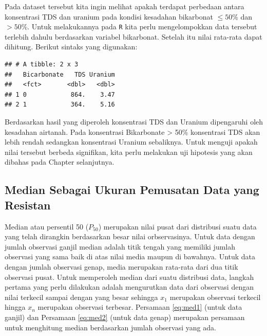\documentclass[]{book}
\newenvironment{Shaded}{\begin{snugshade}}{\end{snugshade}}
\newcommand{\KeywordTok}[1]{\textcolor[rgb]{0.13,0.29,0.53}{\textbf{#1}}}
\newcommand{\DataTypeTok}[1]{\textcolor[rgb]{0.13,0.29,0.53}{#1}}
\newcommand{\StringTok}[1]{\textcolor[rgb]{0.31,0.60,0.02}{#1}}
\newcommand{\OperatorTok}[1]{\textcolor[rgb]{0.81,0.36,0.00}{\textbf{#1}}}
\newcommand{\NormalTok}[1]{#1}
\begin{document}
Pada dataset tersebut kita ingin melihat apakah terdapat perbedaan
antara konsentrasi TDS dan uranium pada kondisi kesadahan bikarbonat
\(\leq 50\)\% dan \(> 50\)\%. Untuk melakukannya pada \texttt{R} kita
perlu mengelompokkan data tersebut terlebih dahulu berdasarkan variabel
bikarbonat. Setelah itu nilai rata-rata dapat dihitung. Berikut sintaks
yang digunakan:

\begin{Shaded}
\end{Shaded}

\begin{verbatim}
## # A tibble: 2 x 3
##   Bicarbonate   TDS Uranium
##   <fct>       <dbl>   <dbl>
## 1 0            864.    3.47
## 2 1            364.    5.16
\end{verbatim}

Berdasarkan hasil yang diperoleh konsentrasi TDS dan Uranium dipengaruhi
oleh kesadahan airtanah. Pada konsentrasi Bikarbonate \textgreater{}
50\% konsentrasi TDS akan lebih rendah sedangkan konsentrasi Uranium
sebaliknya. Untuk menguji apakah nilai tersebut berbeda signifikan, kita
perlu melakukan uji hipotesis yang akan dibahas pada Chapter
selanjutnya.

\subsection{Median Sebagai Ukuran Pemusatan Data yang
Resistan}\label{median-sebagai-ukuran-pemusatan-data-yang-resistan}

Median atau persentil 50 (\(P_{50}\)) merupakan nilai pusat dari
distribusi suatu data yang telah dirangkin berdasarkan besar nilai
orbservasinya. Untuk data dengan jumlah observasi ganjil median adalah
titik tengah yang memiliki jumlah observasi yang sama baik di atas nilai
media maupun di bawahnya. Untuk data dengan jumlah observasi genap,
media merupakan rata-rata dari dua titik observasi pusat. Untuk
memperoleh median dari suatu distribusi data, langkah pertama yang perlu
dilakukan adalah mengurutkan data dari observasi dengan nilai terkecil
sampai dengan yang besar sehingga \(x_1\) merupakan observasi terkecil
hingga \(x_n\) merupakan observasi terbesar. Persamaan \eqref{eq:med1}
(untuk data ganjil) dan Persamaan \eqref{eq:med2} (untuk data genap)
merupakan persamaan untuk menghitung median berdasarkan jumlah observasi
yang ada.
\end{document}
